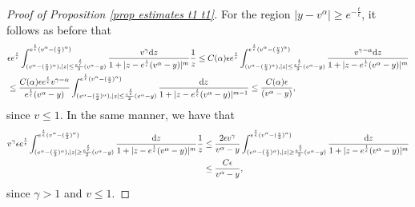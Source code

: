 \documentclass[11pt]{article}
\numberwithin{equation}{section}
\newcommand{\der}{\textup{d}}
\begin{document}
\begin{proof}[Proof of Proposition 
\ref{prop estimates t1 t1}]
For the region  $|y-v^{\alpha}|\geq e^{-\frac{t}{\epsilon}}$, it follows as before that
\begin{align*}
 & \epsilon e^{\frac{t}{\epsilon}} \int_{(v^{\alpha}-(\frac{v}{2})^{\alpha}), |z|\leq \frac{e^{\frac{t}{\epsilon}}}{2}(v^{\alpha}-y)}^{e^{\frac{t}{\epsilon}}(v^{\alpha}-(\frac{v}{2})^{\alpha})}\frac{v^{\gamma}\der z}{1+|z-e^{\frac{t}{\epsilon}}(v^{\alpha}-y)|^{m}}\frac{1}{z}\leq C(\alpha)\epsilon e^{\frac{t}{\epsilon}}\int_{(v^{\alpha}-(\frac{v}{2})^{\alpha}), |z|\leq \frac{e^{\frac{t}{\epsilon}}}{2}(v^{\alpha}-y)}^{e^{\frac{t}{\epsilon}}(v^{\alpha}-(\frac{v}{2})^{\alpha})}\frac{v^{\gamma-\alpha}\der z}{1+|z-e^{\frac{t}{\epsilon}}(v^{\alpha}-y)|^{m}}\\
    &\leq \frac{C(\alpha)\epsilon e^{\frac{t}{\epsilon}} v^{\gamma-\alpha} }{ e^{\frac{t}{\epsilon}}(v^{\alpha}-y)}\int_{(v^{\alpha}-(\frac{v}{2})^{\alpha}), |z|\leq \frac{e^{\frac{t}{\epsilon}}}{2}(v^{\alpha}-y)}^{e^{\frac{t}{\epsilon}}(v^{\alpha}-(\frac{v}{2})^{\alpha})}\frac{\der z}{1+|z-e^{\frac{t}{\epsilon}}(v^{\alpha}-y)|^{m-1}}\leq  \frac{C(\alpha) \epsilon }{ (v^{\alpha}-y)},
\end{align*}
since $v\leq 1$. In the same manner, we have that
\begin{align*}
 v^{\gamma}\epsilon e^{\frac{t}{\epsilon}} \int_{(v^{\alpha}-(\frac{v}{2})^{\alpha}), |z|\geq \frac{e^{\frac{t}{\epsilon}}}{2}(v^{\alpha}-y)}^{e^{\frac{t}{\epsilon}}(v^{\alpha}-(\frac{v}{2})^{\alpha})}\frac{\der z}{1+|z-e^{\frac{t}{\epsilon}}(v^{\alpha}-y)|^{m}}\frac{1}{z} &\leq \frac{2\epsilon v^{\gamma}  }{v^{\alpha}-y}\int_{(v^{\alpha}-(\frac{v}{2})^{\alpha}), |z|\geq  \frac{e^{\frac{t}{\epsilon}}}{2}(v^{\alpha}-y)}^{e^{\frac{t}{\epsilon}}(v^{\alpha}-(\frac{v}{2})^{\alpha})}\frac{\der z}{1+|z-e^{\frac{t}{\epsilon}}(v^{\alpha}-y)|^{m}}\\
  &\leq \frac{C\epsilon  }{v^{\alpha}-y},
 \end{align*}
 since $\gamma>1$ and $v\leq 1$.

\end{proof}
\end{document}
